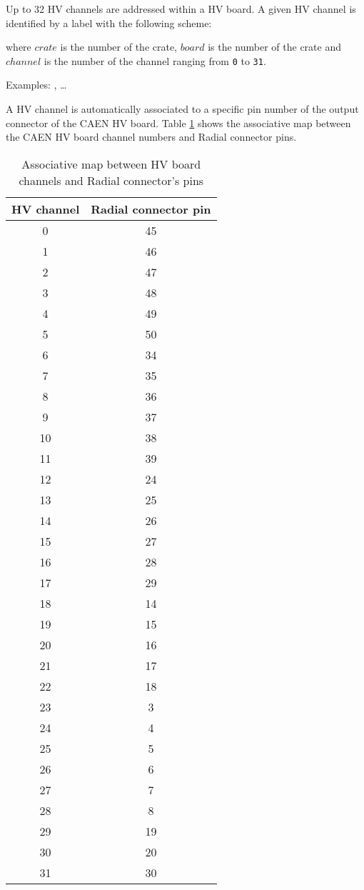 \vskip 10pt \par\noindent Up to 32  HV channels are addressed within a
HV  board.  A  given HV  channel  is identified  by a  label with  the
following scheme:
\begin{center}
 \end{center}
where \texttt{$crate$} is the number of the crate, \texttt{$board$} is
the number  of the crate and  \texttt{$channel$} is the number  of the
channel  ranging   from  \texttt{0}  to   \texttt{31}.
\vskip 10pt\par\noindent
Examples: , \dots {}

\vskip 10pt A HV channel is automatically associated to a specific pin
number  of  the  output  connector   of  the  CAEN  HV  board.   Table
\ref{calohv:channel_pin_map}  shows the  associative  map between  the
CAEN HV board channel numbers and Radial connector pins.

\begin{table}[h!]
  \begin{tabular}{|c|c|}
    \hline
    HV channel & Radial connector pin \\
    \hline
    \hline
    0 & 45  \\
    1 & 46  \\
    2 & 47  \\
    3 & 48  \\
    4 & 49  \\
    5 & 50  \\
    6 & 34  \\
    7 & 35  \\
    8 & 36  \\
    9 & 37  \\
    10 & 38   \\
    11 & 39  \\
    12 & 24  \\
    13 & 25  \\
    14 & 26  \\
    15 & 27  \\
    16 & 28  \\
    17 & 29  \\
    18 & 14  \\
    19 & 15  \\
    20 & 16  \\
    21 & 17  \\
    22 & 18  \\
    23 & 3  \\
    24 & 4  \\
    25 & 5  \\
    26 & 6  \\
    27 & 7  \\
    28 & 8  \\
    29 & 19  \\
    30 & 20  \\
    31 & 30  \\
   \hline
    \end{tabular}
  \caption{Associative map between HV board channels and 
    Radial connector's pins}\label{calohv:channel_pin_map}
\end{table}



